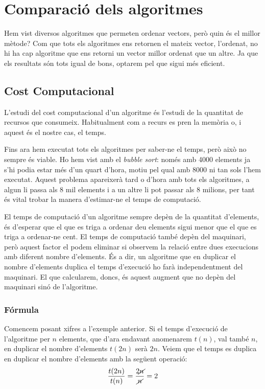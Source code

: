 \chapter{Comparació dels algoritmes}
Hem vist diversos algoritmes que permeten ordenar vectors, però quin és el millor mètode?
Com que tots els algoritmes ens retornen el mateix vector, l'ordenat, no hi ha cap algoritme que ens retorni un vector millor ordenat que un altre. Ja que els resultats són tots igual de bons, optarem pel que sigui més eficient.

\section{Cost Computacional}
L'estudi del cost computacional d'un algoritme és l'estudi de la quantitat de recursos que consumeix. Habitualment com a recurs es pren la memòria o, i aquest és el nostre cas, el temps.

Fins ara hem executat tots els algoritmes per saber-ne el temps, però això no sempre és viable.
Ho hem vist amb el \textit{bubble sort}: només amb 4000 elements ja s'hi podia estar més d'un quart d'hora, motiu pel qual amb 8000 ni tan sols l'hem executat.
Aquest problema apareixerà tard o d'hora amb tots els algoritmes, a algun li passa als 8 mil elements i a un altre li pot passar als 8 milions, per tant és vital trobar la manera d'estimar-ne el temps de computació.

El temps de computació d'un algoritme sempre depèn de la quantitat d'elements, és d'esperar que el que es triga a ordenar deu elements sigui menor que el que es triga a ordenar-ne cent.
El temps de computació també depèn del maquinari, però aquest factor el podem eliminar si observem la relació entre dues execucions amb diferent nombre d'elements.
És a dir, un algoritme que en duplicar el nombre d'elements duplica el temps d'execució ho farà independentment del maquinari.
El que calcularem, doncs, és aquest augment que no depèn del maquinari sinó de l'algoritme.

\subsection{Fórmula}
Comencem posant xifres a l'exemple anterior.
Si el temps d'execució de l'algoritme per $n$ elements, que d'ara endavant anomenarem $t(n)$, val també $n$, en duplicar el nombre d'elements $t(2n)$ serà $2n$.
Veiem que el temps es duplica en duplicar el nombre d'elements amb la següent operació:
\begin{gather*}
	\frac{t(2n)}{t(n)} = \frac{2 \cancel{n}}{ \cancel{n}} = 2
\end{gather*}

